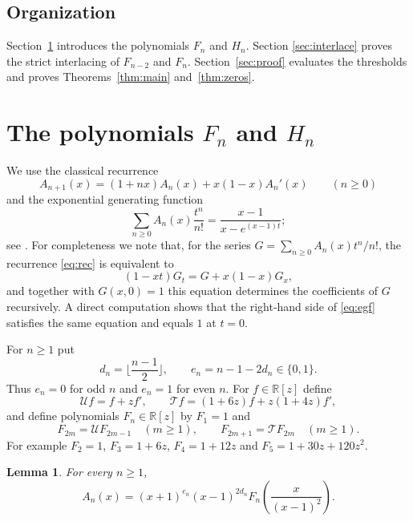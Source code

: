 \documentclass{amsart}
\newtheorem{lemma}[theorem]{Lemma}
\theoremstyle{remark}
\numberwithin{equation}{section}
\newcommand{\RR}{\mathbb{R}}
\newcommand{\cU}{\mathcal{U}}
\newcommand{\cT}{\mathcal{T}}
\begin{document}
\subsection*{Organization}
Section~\ref{sec:F} introduces the polynomials $F_n$ and $H_n$. Section
\ref{sec:interlace} proves the strict interlacing of $F_{n-2}$ and $F_n$.
Section~\ref{sec:proof} evaluates the thresholds and proves
Theorems~\ref{thm:main} and~\ref{thm:zeros}.

\section{The polynomials $F_n$ and $H_n$}\label{sec:F}

We use the classical recurrence
\begin{equation}\label{eq:rec}
A_{n+1}(x)=(1+nx)A_n(x)+x(1-x)A_n'(x)\qquad(n\ge 0)
\end{equation}
and the exponential generating function
\begin{equation}\label{eq:egf}
\sum_{n\ge 0}A_n(x)\frac{t^n}{n!}=\frac{x-1}{x-e^{(x-1)t}};
\end{equation}
see \cite{Comtet}. For completeness we note that, for the series
$G=\sum_{n\ge 0}A_n(x)t^n/n!$, the recurrence \eqref{eq:rec} is equivalent to
\[
(1-xt)G_t=G+x(1-x)G_x,
\]
and together with $G(x,0)=1$ this equation determines the coefficients of
$G$ recursively. A direct computation shows that the right-hand side of
\eqref{eq:egf} satisfies the same equation and equals $1$ at $t=0$.

For $n\ge 1$ put
\[
d_n=\Big\lfloor\frac{n-1}{2}\Big\rfloor,\qquad e_n=n-1-2d_n\in\{0,1\}.
\]
Thus $e_n=0$ for odd $n$ and $e_n=1$ for even $n$. For $f\in\RR[z]$ define
\[
\cU f=f+zf',\qquad \cT f=(1+6z)f+z(1+4z)f',
\]
and define polynomials $F_n\in\RR[z]$ by $F_1=1$ and
\[
F_{2m}=\cU F_{2m-1}\quad(m\ge 1),\qquad F_{2m+1}=\cT F_{2m}\quad(m\ge 1).
\]
For example $F_2=1$, $F_3=1+6z$, $F_4=1+12z$ and $F_5=1+30z+120z^2$.

\begin{lemma}\label{lem:Fn}
For every $n\ge 1$,
\[
A_n(x)=(x+1)^{e_n}(x-1)^{2d_n}F_n\!\left(\frac{x}{(x-1)^2}\right).
\]
\end{lemma}
\end{document}

